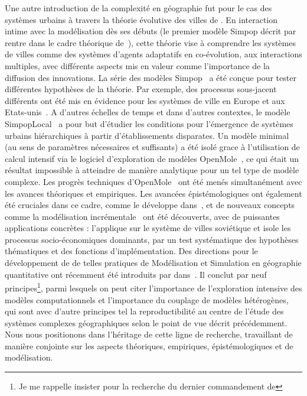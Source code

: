 {Une autre introduction de la complexité en géographie fut pour le cas des systèmes urbains à travers la théorie évolutive des villes de . En interaction intime avec la modélisation dès ses débuts (le premier modèle Simpop décrit par~\cite{sanders1997simpop} rentre dans le cadre théorique de~\cite{pumain1997pour}), cette théorie vise à comprendre les systèmes de villes comme des systèmes d'agents adaptatifs en co-évolution, aux interactions multiples, avec différents aspects mis en valeur comme l'importance de la diffusion des innovations. La série des modèles Simpop~\cite{pumain2012multi} a été conçue pour tester différentes hypothèses de la théorie. Par exemple, des processus sous-jacent différents ont été mis en évidence pour les systèmes de ville en Europe et aux Etats-unis~\cite{bretagnolle2010comparer}. A d'autres échelles de temps et dans d'autres contextes, le modèle SimpopLocal~\cite{schmitt2014modelisation} a pour but d'étudier les conditions pour l'émergence de systèmes urbains hiérarchiques à partir d'établissements disparates. Un modèle minimal (au sens de paramètres nécessaires et suffisants) a été isolé grace à l'utilisation de calcul intensif via le logiciel d'exploration de modèles OpenMole~\cite{schmitt2014half}, ce qui était un résultat impossible à atteindre de manière analytique pour un tel type de modèle complexe. Les progrès techniques d'OpenMole~\cite{reuillon2013openmole} ont été menés simultanément avec les avances théoriques et empiriques. Les avancées épistémologiques ont également été cruciales dans ce cadre, comme  le développe dans~\cite{rey2015plateforme}, et de nouveaux concepts comme la modélisation incrémentale~\cite{cottineau2015incremental} ont été découverts, avec de puissantes applications concrètes : \cite{cottineau2014evolution} l'applique sur le système de villes soviétique et isole les processus socio-économiques dominants, par un test systématique des hypothèses thématiques et des fonctions d'implémentation. Des directions pour le développement de de telles pratiques de Modélisation et Simulation en géographie quantitative ont récemment été introduits par  dans~\cite{banos2013pour}. Il conclut par neuf principes\footnote{Je me rappelle  insister pour la recherche du dernier commandement de }, parmi lesquels on peut citer l'importance de l'exploration intensive des modèles computationnels et l'importance du couplage de modèles hétérogènes, qui sont avec d'autre principes tel la reproductibilité au centre de l'étude des systèmes complexes géographiques selon le point de vue décrit précédemment. Nous nous positionons dans l'héritage de cette ligne de recherche, travaillant de manière conjointe sur les aspects théoriques, empiriques, épistémologiques et de modélisation.
}



